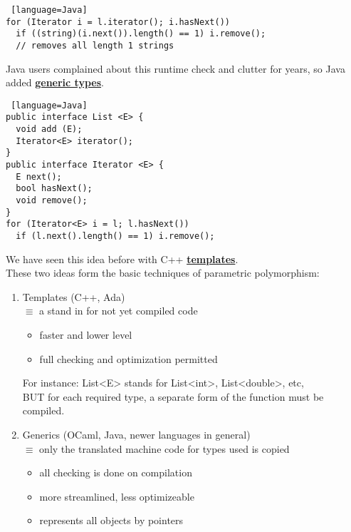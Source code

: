 \documentclass[../../lecture_notes.tex]{subfiles}
\begin{document}
\begin{enumerate} [itemsep=0mm]
\begin{lstlisting} [language=Java]
for (Iterator i = l.iterator(); i.hasNext())
  if ((string)(i.next()).length() == 1) i.remove(); 
  // removes all length 1 strings
		\end{lstlisting}
		Java users complained about this runtime check and clutter for years, 
			so Java added \textbf{\underline{generic types}}.
		\begin{lstlisting} [language=Java]
public interface List <E> {
  void add (E);
  Iterator<E> iterator();
} 
public interface Iterator <E> {
  E next();
  bool hasNext();
  void remove();
}
for (Iterator<E> i = l; l.hasNext())
  if (l.next().length() == 1) i.remove();
		\end{lstlisting}
		We have seen this idea before with C++ \textbf{\underline{templates}}.\\
		These two ideas form the basic techniques of parametric polymorphism:
		\begin{enumerate} [itemsep=0mm]
			\item Templates (C++, Ada)\\
				$\equiv$ a stand in for not yet compiled code
				\begin{itemize} [itemsep=0mm]
					\item faster and lower level
					\item full checking and optimization permitted
				\end{itemize}
				For instance: List<E> stands for List<int>, List<double>, etc, \\
					BUT for each required type, a separate form of the function must be compiled.
			\item Generics (OCaml, Java, newer languages in general)\\
				$\equiv$ only the translated machine code for types used is copied
				\begin{itemize} [itemsep=0mm]
					\item all checking is done on compilation
					\item more streamlined, less optimizeable
					\item represents all objects by pointers
				\end{itemize}
		\end{enumerate}
\end{enumerate}
\end{document}
